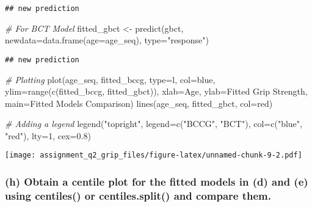 \documentclass[
]{article}
\newenvironment{Shaded}{\begin{snugshade}}{\end{snugshade}}
\newcommand{\AttributeTok}[1]{\textcolor[rgb]{0.77,0.63,0.00}{#1}}
\newcommand{\CommentTok}[1]{\textcolor[rgb]{0.56,0.35,0.01}{\textit{#1}}}
\newcommand{\DecValTok}[1]{\textcolor[rgb]{0.00,0.00,0.81}{#1}}
\newcommand{\FloatTok}[1]{\textcolor[rgb]{0.00,0.00,0.81}{#1}}
\newcommand{\FunctionTok}[1]{\textcolor[rgb]{0.00,0.00,0.00}{#1}}
\newcommand{\NormalTok}[1]{#1}
\newcommand{\OtherTok}[1]{\textcolor[rgb]{0.56,0.35,0.01}{#1}}
\newcommand{\StringTok}[1]{\textcolor[rgb]{0.31,0.60,0.02}{#1}}
\begin{document}
\begin{verbatim}
## new prediction
\end{verbatim}

\begin{Shaded}
\begin{Highlighting}[]
\CommentTok{\# For BCT Model}
\NormalTok{fitted\_gbct }\OtherTok{\textless{}{-}} \FunctionTok{predict}\NormalTok{(gbct, }\AttributeTok{newdata=}\FunctionTok{data.frame}\NormalTok{(}\AttributeTok{age=}\NormalTok{age\_seq), }\AttributeTok{type=}\StringTok{"response"}\NormalTok{)}
\end{Highlighting}
\end{Shaded}

\begin{verbatim}
## new prediction
\end{verbatim}

\begin{Shaded}
\begin{Highlighting}[]
\CommentTok{\# Plotting}
\FunctionTok{plot}\NormalTok{(age\_seq, fitted\_bccg, }\AttributeTok{type=}\StringTok{\textquotesingle{}l\textquotesingle{}}\NormalTok{, }\AttributeTok{col=}\StringTok{\textquotesingle{}blue\textquotesingle{}}\NormalTok{, }\AttributeTok{ylim=}\FunctionTok{range}\NormalTok{(}\FunctionTok{c}\NormalTok{(fitted\_bccg, fitted\_gbct)),}
     \AttributeTok{xlab=}\StringTok{\textquotesingle{}Age\textquotesingle{}}\NormalTok{, }\AttributeTok{ylab=}\StringTok{\textquotesingle{}Fitted Grip Strength\textquotesingle{}}\NormalTok{, }\AttributeTok{main=}\StringTok{\textquotesingle{}Fitted Models Comparison\textquotesingle{}}\NormalTok{)}
\FunctionTok{lines}\NormalTok{(age\_seq, fitted\_gbct, }\AttributeTok{col=}\StringTok{\textquotesingle{}red\textquotesingle{}}\NormalTok{)}

\CommentTok{\# Adding a legend}
\FunctionTok{legend}\NormalTok{(}\StringTok{"topright"}\NormalTok{, }\AttributeTok{legend=}\FunctionTok{c}\NormalTok{(}\StringTok{"BCCG"}\NormalTok{, }\StringTok{"BCT"}\NormalTok{), }\AttributeTok{col=}\FunctionTok{c}\NormalTok{(}\StringTok{"blue"}\NormalTok{, }\StringTok{"red"}\NormalTok{), }\AttributeTok{lty=}\DecValTok{1}\NormalTok{, }\AttributeTok{cex=}\FloatTok{0.8}\NormalTok{)}
\end{Highlighting}
\end{Shaded}

\texttt{[image: assignment\_q2\_grip\_files/figure-latex/unnamed-chunk-9-2.pdf]}

\hypertarget{h-obtain-a-centile-plot-for-the-fitted-models-in-d-and-e-using-centiles-or-centiles.split-and-compare-them.}{%
\subsubsection{(h) Obtain a centile plot for the fitted models in (d)
and (e) using centiles() or centiles.split() and compare
them.}\label{h-obtain-a-centile-plot-for-the-fitted-models-in-d-and-e-using-centiles-or-centiles.split-and-compare-them.}}
\end{document}
